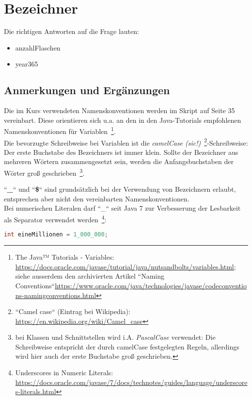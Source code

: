 \chapter{Bezeichner}

Die richtigen Antworten auf die Frage lauten:

\begin{itemize}
    \item anzahlFlaschen
    \item year365
\end{itemize}


\section*{Anmerkungen und Ergänzungen}


Die im Kurs verwendeten Namenskonventionen werden im Skript auf Seite 35 vereinbart.
Diese orientieren sich u.a. an den
in den Java-Tutorials empfohlenen Namenskonventionen für Variablen~\footnote{The Java™ Tutorials - Variables:
    \url{https://docs.oracle.com/javase/tutorial/java/nutsandbolts/variables.html};
    siehe ausserdem den archivierten Artikel ``Naming Conventions``\url{https://www.oracle.com/java/technologies/javase/codeconventions-namingconventions.html}
}.\\

Die bevorzugte Schreibweise bei Variablen ist die \textit{camelCase (sic!)}~\footnote{``Camel case`` (Eintrag bei Wikipedia): \url{https://en.wikipedia.org/wiki/Camel_case}}-Schreibweise: Der erste Buchstabe des Bezeichners ist immer klein.
Sollte der Bezeichner aus mehreren Wörtern zusammengesetzt sein, werden die Anfangsbuchstaben der Wörter groß geschrieben~\footnote{
    bei Klassen und Schnittstellen wird i.A. \textit{PascalCase} verwendet: Die Schreibweise entspricht der durch camelCase festgelegten Regeln, allerdings wird hier auch der erste Buchstabe groß geschrieben.
}.

``\textbf{\_}`` und ``\textbf{\$}`` sind grundsätzlich bei der Verwendung von Bezeichnern erlaubt, entsprechen aber nicht
den vereinbarten Namenskonventionen.\\

Bei numerischen Literalen darf ``\_`` seit Java 7 zur Verbesserung der Lesbarkeit als Separator verwendet werden~\footnote{
    Underscores in Numeric Literals: \url{https://docs.oracle.com/javase/7/docs/technotes/guides/language/underscores-literals.html}
}:

\begin{lstlisting}[language=java]
int eineMillionen = 1_000_000;
\end{lstlisting}

